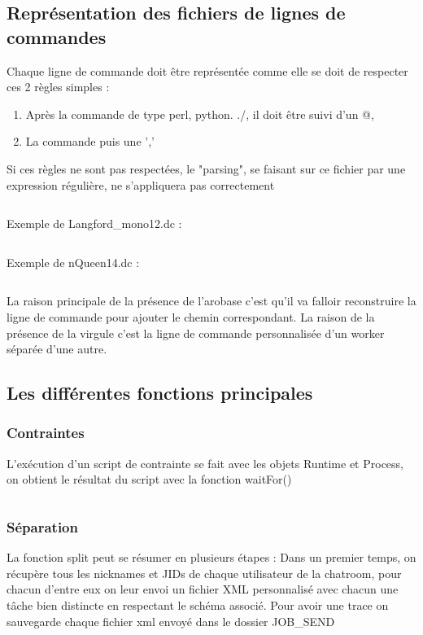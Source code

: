 \documentclass[11pt]{article}
\begin{document}
\subsection{Représentation des fichiers de lignes de commandes} 
Chaque ligne de commande doit être représentée comme elle se doit de respecter ces 2 règles simples : 
\begin{enumerate}
\item Après la commande de type perl, python. ./, il doit être suivi d'un @,  
\item La commande puis une ','
\end{enumerate}
Si ces règles ne sont pas respectées, le "parsing", se faisant sur ce fichier par une expression régulière, ne s\textquoteright appliquera pas correctement  
\inputminted{perl}{../Echantillon_Script_Cmd/Toto.dc}
Exemple de Langford\_mono12.dc :
\inputminted{perl}{../Echantillon_Script_Cmd/Langford_mono12.dc}
Exemple de nQueen14.dc :
\inputminted{perl}{../Echantillon_Script_Cmd/nQuenn14.dc}

La raison principale de la présence de l'arobase c'est qu'il va falloir reconstruire la ligne de commande pour ajouter le chemin correspondant.
La raison de la présence de la virgule c'est la ligne de commande personnalisée d'un worker séparée d'une autre.
\newpage
\subsection{Les différentes fonctions principales}

\subsubsection{Contraintes} 
L'exécution d'un script de contrainte se fait avec les objets Runtime et Process, on obtient le résultat du script avec la fonction waitFor() 
\inputminted{perl}{../Echantillon_Script_Perl/OSname.pl}
\newpage
\subsubsection{Séparation} 
La fonction split peut se résumer en plusieurs étapes : Dans un premier temps, on récupère tous les nicknames et JIDs de chaque utilisateur de la chatroom, pour chacun d'entre eux on leur envoi un fichier XML personnalisé avec chacun une tâche bien distincte en respectant le schéma associé. Pour avoir une trace on sauvegarde chaque fichier xml envoyé dans le dossier JOB\_SEND
\inputminted[tabsize=2,frame=lines,linenos]{java}{Fichier_import/split.java}
\end{document}
